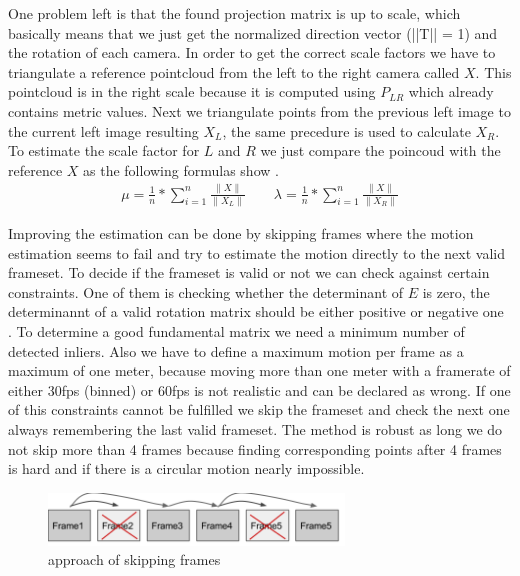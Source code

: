 \documentclass[11pt]{article}
\begin{document}
	One problem left is that the found projection matrix is up to scale, which basically means that we just get the normalized direction vector (||T|| = 1) and the rotation of each camera. In order to get the correct scale factors we have to triangulate a reference pointcloud from the left to the right camera called $X$. This pointcloud is in the right scale because it is computed using $P_{LR}$ which already contains metric values. Next we triangulate points from the previous left image to the current left image resulting $X_L$, the same precedure is used to calculate $X_R$. To estimate the scale factor for $L$ and $R$ we just compare the poincoud with the reference $X$ as the following formulas show \cite{InteressantesPaper}.
	\begin{align}
	  \mu = \frac{1}{n} * \sum_{i=1}^{n} \frac{\|X\|}{\|X_L\|} \qquad
	  \lambda = \frac{1}{n} * \sum_{i=1}^{n} \frac{\|X\|}{\|X_R\|}
	\end{align}

	Improving the estimation can be done by skipping frames where the motion estimation seems to fail and try to estimate the motion directly to the next valid frameset. To decide if the frameset is valid or not we can check against certain constraints. One of them is checking whether the determinant of $E$ is zero, the determinannt of a valid rotation matrix should be either positive or negative one \cite{ValidEssential}. To determine a good fundamental matrix we need a minimum number of detected inliers. Also we have to define a maximum motion per frame as a maximum of one meter, because moving more than one meter with a framerate of either 30fps (binned) or 60fps is not realistic and can be declared as wrong. If one of this constraints cannot be fulfilled we skip the frameset and check the next one always remembering the last valid frameset. The method is robust as long we do not skip more than 4 frames because finding corresponding points after 4 frames is hard and if there is a circular motion nearly impossible. 

	\begin{figure}[H]
		\centering
		\includegraphics[width=0.7\textwidth]{images/skipFrames.png}
		\caption{approach of skipping frames}
	\end{figure}
	
\end{document}
